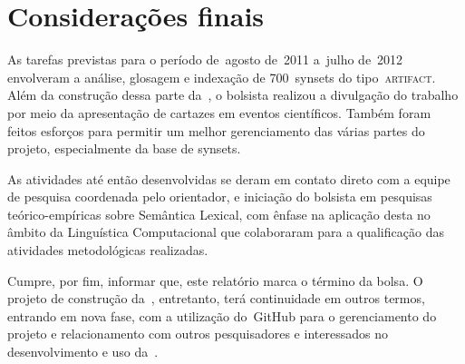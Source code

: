 \chapter{Considerações finais}

% 
% 

As tarefas previstas para o período de~agosto de~2011 a~julho de~2012 envolveram
a análise, glosagem e indexação de 700~synsets do tipo~\textsc{artifact}. Além
da construção dessa parte da~\wnbr, o bolsista realizou a divulgação do
trabalho por meio da apresentação de cartazes em eventos científicos. Também
foram feitos esforços para permitir um melhor gerenciamento das várias partes
do projeto, especialmente da base de synsets.

As atividades até então desenvolvidas se deram em contato direto com a equipe
de pesquisa coordenada pelo orientador, e iniciação do bolsista em pesquisas
teórico-empíricas sobre Semântica Lexical, com ênfase na aplicação desta no
âmbito da Linguística Computacional que colaboraram para a qualificação das
atividades metodológicas realizadas.

Cumpre, por fim, informar que, este relatório marca o término da bolsa. O
projeto de construção da~\wnbr, entretanto, terá continuidade em outros
termos, entrando em nova fase, com a utilização do~GitHub para o gerenciamento
do projeto e relacionamento com outros pesquisadores e interessados no
  desenvolvimento e uso da~\wnbr.
